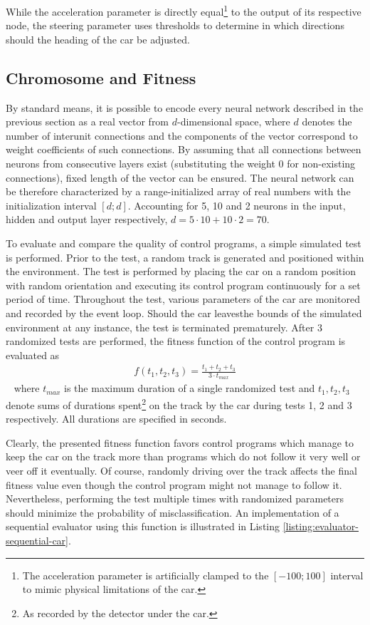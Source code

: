 While the acceleration parameter is directly equal\footnote{The acceleration parameter is artificially clamped to the $[-100;100]$ interval to mimic physical limitations of the car.} to the output of its respective node, the steering parameter uses thresholds to determine in which directions should the heading of the car be adjusted.

\subsection{Chromosome and Fitness}
By standard means, it is possible to encode every neural network described in the previous section as a real vector from $d$-dimensional space, where $d$ denotes the number of interunit connections and the components of the vector correspond to weight coefficients of such connections. By assuming that all connections between neurons from consecutive layers exist (substituting the weight 0 for non-existing connections), fixed length of the vector can be ensured. The neural network can be therefore characterized by a range-initialized array of real numbers with the initialization interval $[d;d]$. Accounting for 5, 10 and 2 neurons in the input, hidden and output layer respectively, $d=5\cdot 10+10\cdot 2=70$.

To evaluate and compare the quality of control programs, a simple simulated test is performed. Prior to the test, a random track is generated and positioned within the environment. The test is performed by placing the car on a random position with random orientation and executing its control program continuously for a set period of time. Throughout the test, various parameters of the car are monitored and recorded by the event loop. Should the car leavesthe bounds of the simulated environment at any instance, the test is terminated prematurely. After 3 randomized tests are performed, the fitness function of the control program is evaluated as
~
\begin{align}
	f(t_1,t_2,t_3) = \frac{t_1 + t_2 + t_3}{3 \cdot t_{max}}
\end{align}
~
where $t_{max}$ is the maximum duration of a single randomized test and $t_1,t_2,t_3$ denote sums of durations spent\footnote{As recorded by the detector under the car.} on the track by the car during tests 1, 2 and 3 respectively. All durations are specified in seconds.

Clearly, the presented fitness function favors control programs which manage to keep the car on the track more than programs which do not follow it very well or veer off it eventually. Of course, randomly driving over the track affects the final fitness value even though the control program might not manage to follow it. Nevertheless, performing the test multiple times with randomized parameters should minimize the probability of misclassification. An implementation of a sequential evaluator using this function is illustrated in Listing \ref{listing:evaluator-sequential-car}.

